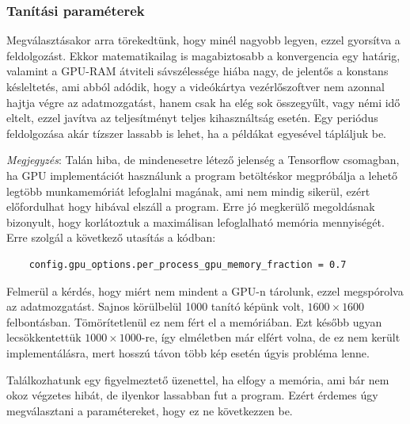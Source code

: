 \subsubsection{Tanítási paraméterek}



\nopagebreak

Megválasztásakor arra törekedtünk, hogy minél nagyobb legyen, ezzel gyorsítva a feldolgozást.
Ekkor matematikailag is magabiztosabb a konvergencia egy határig, 
valamint a GPU-RAM átviteli sávszélessége hiába nagy, de jelentős a konstans késleltetés, 
ami abból adódik, hogy a videókártya vezérlőszoftver nem azonnal hajtja végre az adatmozgatást,
hanem csak ha elég sok összegyűlt, vagy némi idő eltelt, ezzel javítva az teljesítményt teljes 
kihasználtság esetén. Egy periódus feldolgozása akár tízszer lassabb is lehet, ha a példákat
egyesével tápláljuk be.



\label{gpu.memory}
\textit{Megjegyzés}: Talán hiba, de mindenesetre létező jelenség a Tensorflow csomagban, ha GPU implementációt használunk a program betöltéskor megpróbálja a lehető legtöbb 
munkamemóriát lefoglalni magának, ami nem mindig sikerül, 
ezért előfordulhat hogy hibával elszáll a program. Erre jó megkerülő megoldásnak bizonyult, hogy
korlátoztuk a maximálisan lefoglalható memória mennyiségét. Erre szolgál a következő utasítás a kódban:
\begin{lstlisting}
	config.gpu_options.per_process_gpu_memory_fraction = 0.7
\end{lstlisting}


Felmerül a kérdés, hogy miért nem mindent a GPU-n tárolunk, ezzel megspórolva az adatmozgatást.
Sajnos körülbelül 1000 tanító képünk volt, $ 1600 \times 1600 $ felbontásban. 
Tömörítetlenül ez nem fért el a memóriában. Ezt később ugyan lecsökkentettük
$ 1000 \times 1000 $-re, így elméletben már elfért volna, de ez nem került implementálásra,
mert hosszú távon több kép esetén úgyis probléma lenne.



Találkozhatunk egy figyelmeztető üzenettel, ha elfogy a memória, ami bár nem 
okoz végzetes hibát, de ilyenkor lassabban fut a program. Ezért érdemes úgy megválasztani
a paramétereket, hogy ez ne következzen be.


